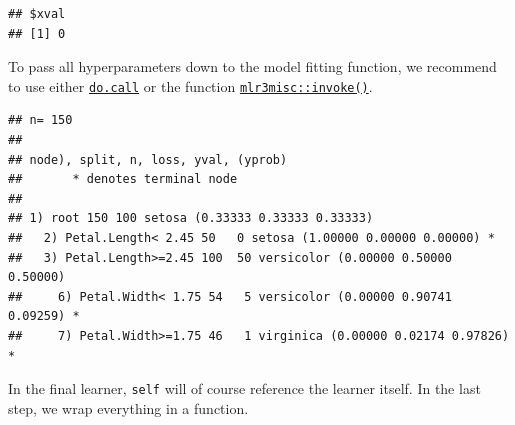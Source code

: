 \documentclass[]{scrbook}
\newenvironment{Shaded}{\begin{snugshade}}{\end{snugshade}}
\newcommand{\ControlFlowTok}[1]{\textcolor[rgb]{0.13,0.29,0.53}{\textbf{#1}}}
\newcommand{\DataTypeTok}[1]{\textcolor[rgb]{0.13,0.29,0.53}{#1}}
\newcommand{\KeywordTok}[1]{\textcolor[rgb]{0.13,0.29,0.53}{\textbf{#1}}}
\newcommand{\NormalTok}[1]{#1}
\newcommand{\OperatorTok}[1]{\textcolor[rgb]{0.81,0.36,0.00}{\textbf{#1}}}
\newcommand{\StringTok}[1]{\textcolor[rgb]{0.31,0.60,0.02}{#1}}
\renewenvironment{Shaded} {\begin{snugshade}\small} {\end{snugshade}}
\begin{document}
\begin{verbatim}
## $xval
## [1] 0
\end{verbatim}

To pass all hyperparameters down to the model fitting function, we recommend to use either \href{https://www.rdocumentation.org/packages/base/topics/do.call}{\texttt{do.call}} or the function \href{https://mlr3misc.mlr-org.com/reference/invoke.html}{\texttt{mlr3misc::invoke()}}.

\begin{Shaded}
\end{Shaded}

\begin{verbatim}
## n= 150 
## 
## node), split, n, loss, yval, (yprob)
##       * denotes terminal node
## 
## 1) root 150 100 setosa (0.33333 0.33333 0.33333)  
##   2) Petal.Length< 2.45 50   0 setosa (1.00000 0.00000 0.00000) *
##   3) Petal.Length>=2.45 100  50 versicolor (0.00000 0.50000 0.50000)  
##     6) Petal.Width< 1.75 54   5 versicolor (0.00000 0.90741 0.09259) *
##     7) Petal.Width>=1.75 46   1 virginica (0.00000 0.02174 0.97826) *
\end{verbatim}

In the final learner, \texttt{self} will of course reference the learner itself.
In the last step, we wrap everything in a function.

\begin{Shaded}
\end{Shaded}
\end{document}
